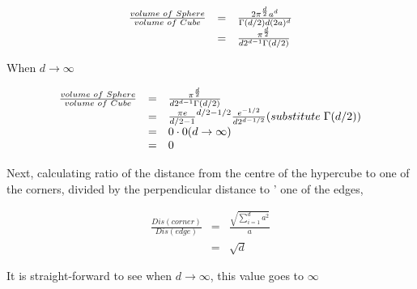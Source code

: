 \documentclass{article} %
\begin{document}
\begin{equation}
    \begin{array}{rcl}
     	\frac{volume  \hspace{1mm} of  \hspace{1mm} Sphere}{volume  \hspace{1mm} of  \hspace{1mm} Cube} & = & \frac{2 \pi^{\frac{d}{2}}a^d}{\Gamma(d/2)d(2a)^d}   \\
	& = & \frac {\pi^{\frac{d}{2}}}{d2^{d-1}\Gamma(d/2)}
    \end{array}
\end{equation}

When $d \to \infty $

\begin{equation}
    \begin{array}{rcl}
     	\frac{volume  \hspace{1mm}of  \hspace{1mm}Sphere}{volume  \hspace{1mm}of  \hspace{1mm}Cube} & = & \frac {\pi^{\frac{d}{2}}}{d2^{d-1}\Gamma(d/2)} \\
	& = & {\frac{\pi e }{d/2 - 1}}^{d/2-1/2} \frac{e^{-1/2}}{d2^{d-1/2}}(substitute \hspace{1mm}\Gamma(d/2)) \\
	& = & 0 \cdot 0 (d \to \infty) \\
	& = & 0
    \end{array}
\end{equation}

Next, calculating  ratio of the distance from the centre of the
hypercube to one of the corners, divided by the perpendicular distance to
' one of the edges,

\begin{equation}
    \begin{array}{rcl}
     	\frac{Dis(corner)}{Dis(edge)} & = &\frac{\sqrt{\sum\limits_{i = 1}^{d}a^2}}{a} \\
	& = & \sqrt{d}
    \end{array}
\end{equation}

It is straight-forward to see when $d \to \infty$, this value goes to $\infty$

\subsection{}
\end{document}

